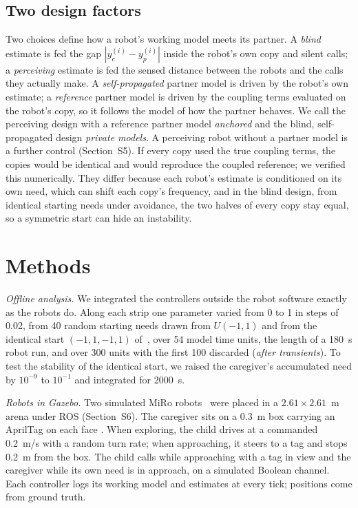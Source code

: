 \documentclass[journal]{IEEEtran}
\newif\ifdraftmarkers
\newcommand{\citeneeded}[1]{\ifdraftmarkers\textcolor{red}{[CITE:~#1]}\addtocontents{cnd}{\protect\item #1}\fi}
\begin{document}
\subsection{Two design factors}
\label{sec:designs}
Two choices define how a robot's working model meets its partner. A \emph{blind} estimate is fed the gap $|y_c^{(i)}-y_p^{(i)}|$ inside the robot's own copy and silent calls; a \emph{perceiving} estimate is fed the sensed distance between the robots and the calls they actually make. A \emph{self-propagated} partner model is driven by the robot's own estimate; a \emph{reference} partner model is driven by the coupling terms evaluated on the robot's copy, so it follows the model of how the partner behaves. We call the perceiving design with a reference partner model \emph{anchored} and the blind, self-propagated design \emph{private models}. A perceiving robot without a partner model is a further control (Section~S5). If every copy used the true coupling terms, the copies would be identical and would reproduce the coupled reference; we verified this numerically. They differ because each robot's estimate is conditioned on its own need, which can shift each copy's frequency, and in the blind design, from identical starting needs under avoidance, the two halves of every copy stay equal, so a symmetric start can hide an instability.

\section{Methods}
\label{sec:method}

\emph{Offline analysis.} We integrated the controllers outside the robot software exactly as the robots do. Along each strip one parameter varied from 0 to 1 in steps of 0.02, from 40 random starting needs drawn from $U(-1,1)$ and from the identical start $(-1,1,-1,1)$ of~\cite{Htet2024}, over 54 model time units, the length of a 180~s robot run, and over 300 units with the first 100 discarded (\emph{after transients}). To test the stability of the identical start, we raised the caregiver's accumulated need by $10^{-9}$ to $10^{-1}$ and integrated for 2000~s.

\emph{Robots in Gazebo.} Two simulated MiRo robots~\cite{Prescott2017miro,Mitchinson2016miro} were placed in a $2.61\times2.61$~m arena under ROS \citeneeded{ROS and Gazebo} (Section~S6). The caregiver sits on a 0.3~m box carrying an AprilTag on each face \citeneeded{AprilTag fiducial detection}. When exploring, the child drives at a commanded 0.2~m/s with a random turn rate; when approaching, it steers to a tag and stops 0.2~m from the box. The child calls while approaching with a tag in view and the caregiver while its own need is in approach, on a simulated Boolean channel. Each controller logs its working model and estimates at every tick; positions come from ground truth.
\end{document}
